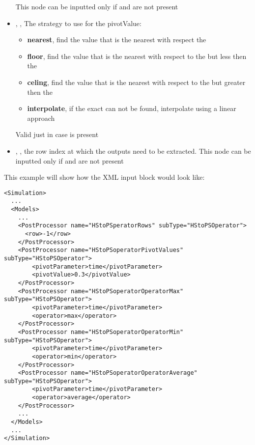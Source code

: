 \begin{itemize}
       \nb This node can be inputted only if  and  are not present
     \item {}, , The strategy to use for the pivotValue:
       \begin{itemize}
        \item \textbf{nearest}, find the value that is the nearest with respect the 
        \item \textbf{floor}, find the value that is the nearest with respect to the  but less then the  
        \item \textbf{celing}, find the value that is the nearest with respect to the  but greater then the  
        \item \textbf{interpolate}, if the exact    can not be found, interpolate using a linear approach
       \end{itemize}

       \nb Valid just in case  is present
     \item {}, , the row index at which the outputs need to be extracted.
       \nb This node can be inputted only if  and  are not present
\end{itemize}

This example will show how the XML input block would look like:

\begin{lstlisting}[style=XML,morekeywords={subType,debug,name,class,type}]
<Simulation>
  ...
  <Models>
    ...
    <PostProcessor name="HStoPSperatorRows" subType="HStoPSOperator">
      <row>-1</row>
    </PostProcessor>
    <PostProcessor name="HStoPSoperatorPivotValues" subType="HStoPSOperator">
        <pivotParameter>time</pivotParameter>
        <pivotValue>0.3</pivotValue>
    </PostProcessor>
    <PostProcessor name="HStoPSoperatorOperatorMax" subType="HStoPSOperator">
        <pivotParameter>time</pivotParameter>
        <operator>max</operator>
    </PostProcessor>
    <PostProcessor name="HStoPSoperatorOperatorMin" subType="HStoPSOperator">
        <pivotParameter>time</pivotParameter>
        <operator>min</operator>
    </PostProcessor>
    <PostProcessor name="HStoPSoperatorOperatorAverage" subType="HStoPSOperator">
        <pivotParameter>time</pivotParameter>
        <operator>average</operator>
    </PostProcessor>
    ...
  </Models>
  ...
</Simulation>
\end{lstlisting}

